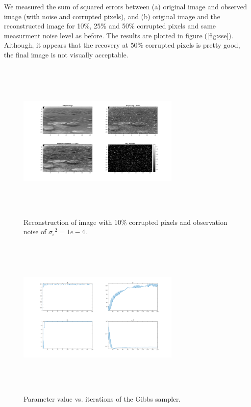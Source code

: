 \documentclass[a4paper,10pt]{article}
\def\sigmaeps{{\sigma_{\epsilon}}}
\begin{document}
We measured the sum of squared errors between (a) original image and observed image (with noise and corrupted pixels), and (b) original image and the reconstructed image for 10\%, 25\% and 50\% corrupted pixels and same measurment noise level as before. The results are plotted in figure (\ref{fig:sse}). Although, it appears that the recovery at 50\% corrupted pixels is pretty good, the final image is not visually acceptable.
\begin{figure}[H]
 \centering
 \includegraphics[width=8cm, height=8cm]{image.png}
 \caption{Reconstruction of image with 10\% corrupted pixels and observation noise of $\sigmaeps^2 = 1e-4$.}
 \label{fig:img10}
\end{figure}
\begin{figure}[H]
 \centering
 \includegraphics[width=8cm, height=8cm]{params.png}
 \caption{Parameter value vs. iterations of the Gibbs sampler.}
 \label{fig:param10}
\end{figure}
\end{document}
